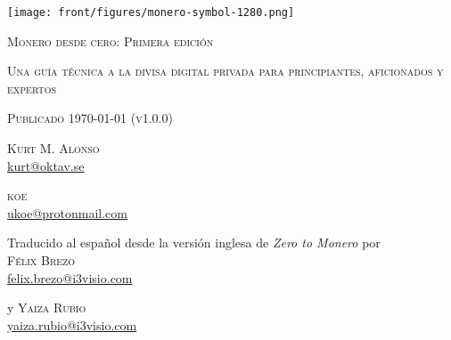 \documentclass[usletter,11pt,english,oneside,onecolumn,final,openany]{report}
\begin{document}
\setlength{\abovedisplayskip}{0pt}
\setlength{\belowdisplayskip}{0pt}
\setlength{\abovedisplayshortskip}{0pt}
\setlength{\belowdisplayshortskip}{0pt}


\pagestyle{plain}
\thispagestyle{empty}

\mbox{}
\vspace{1cm}

\begin{center}
  \texttt{[image: front/figures/monero-symbol-1280.png]}
\end{center}


\vfill{}
{\par\centering \textsc{\huge Monero desde cero: Primera edición}\par}
\smallskip
{\par\centering \textsc{\LARGE Una guía técnica a la divisa digital privada para principiantes, aficionados y expertos}\par}
\smallskip
{\par\centering \textsc{\LARGE Publicado \today{} (v1.0.0)}\par}
\bigskip
{\par\centering \textsc{\large Kurt M. Alonso} \\\underline{kurt@oktav.se}
\par \textsc{\large koe} \\\underline{ukoe@protonmail.com}\par \par
\par \vspace{.33cm} \footnotesize{Traducido al español desde la versión inglesa de \textit{Zero to Monero} por\\  \textsc{Félix Brezo}\\\underline{felix.brezo@i3visio.com}\par \par
\par y \textsc{Yaiza Rubio} \\\underline{yaiza.rubio@i3visio.com}\par \par}}
\vfill{}
\end{document}
